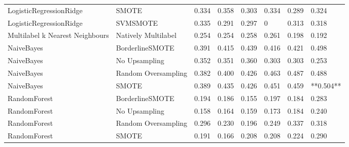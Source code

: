 \begin{tabular}{llllllll}
        LogisticRegressionRidge &                         SMOTE & 0.334 &                     0.358 &                 0.303 &                  0.334 &                                   0.289 &     0.324 \\
        LogisticRegressionRidge &                      SVMSMOTE & 0.335 &                     0.291 &                 0.297 &                      0 &                                   0.313 &     0.318 \\
Multilabel k Nearest Neighbours &           Natively Multilabel & 0.254 &                     0.254 &                 0.258 &                  0.261 &                                   0.198 &     0.192 \\
                     NaiveBayes &               BorderlineSMOTE & 0.391 &                     0.415 &                 0.439 &                  0.416 &                                   0.421 &     0.498 \\
                     NaiveBayes &                 No Upsampling & 0.352 &                     0.351 &                 0.360 &                  0.303 &                                   0.303 &     0.253 \\
                     NaiveBayes &           Random Oversampling & 0.382 &                     0.400 &                 0.426 &                  0.463 &                                   0.487 &     0.488 \\
                     NaiveBayes &                         SMOTE & 0.389 &                     0.435 &                 0.426 &                  0.451 &                                   0.459 & **0.504** \\
                   RandomForest &               BorderlineSMOTE & 0.194 &                     0.186 &                 0.155 &                  0.197 &                                   0.184 &     0.283 \\
                   RandomForest &                 No Upsampling & 0.158 &                     0.164 &                 0.159 &                  0.173 &                                   0.184 &     0.240 \\
                   RandomForest &           Random Oversampling & 0.296 &                     0.230 &                 0.196 &                  0.249 &                                   0.337 &     0.318 \\
                   RandomForest &                         SMOTE & 0.191 &                     0.166 &                 0.208 &                  0.208 &                                   0.224 &     0.290 \\

\end{tabular}
